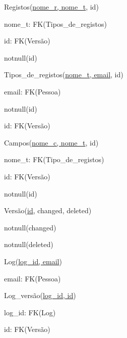 \documentclass[11pt,a4paper]{article}
\begin{document}
\begin{description}[noitemsep]
	\item Registos(\underline{nome\_r, nome\_t},  id)
	\item nome\_t: FK(Tipos\_de\_registos)
	\item id: FK(Vers\~{a}o)
	\item notnull(id)
\end{description}

\begin{description}[noitemsep]
	\item Tipos\_de\_registos(\underline{nome\_t, email}, id)
	\item email: FK(Pessoa)
	\item notnull(id)
	\item id: FK(Vers\~{a}o)
\end{description}
\newpage

\begin{description}[noitemsep]
	\item Campos(\underline{nome\_c, nome\_t}, id)
	\item nome\_t: FK(Tipo\_de\_registos)
	\item id: FK(Vers\~{a}o)
	\item notnull(id)
\end{description}

\begin{description}[noitemsep]
	\item Vers\~{a}o(\underline{id}, changed, deleted)
	\item notnull(changed)
	\item notnull(deleted)
\end{description}

\begin{description}[noitemsep]
	\item Log(\underline{log\_id, email})
	\item email: FK(Pessoa)
\end{description}

\begin{description}[noitemsep]
	\item Log\_vers\~{a}o(\underline{log\_id, id})
	\item log\_id: FK(Log)
	\item id: FK(Vers\~{a}o)
\end{description}
\end{document}

